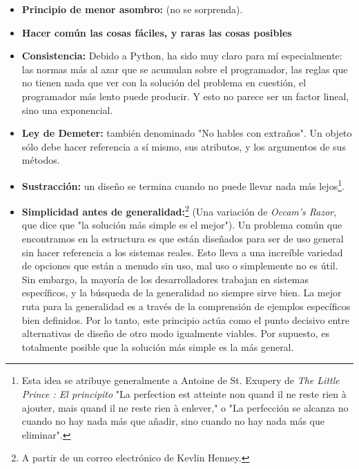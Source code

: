 \begin{itemize} %
    \item \textbf{Principio de menor asombro:}    (no se sorprenda).
    
    \item \textbf{Hacer común las cosas fáciles, y raras las cosas posibles}
    
    \item \textbf{Consistencia:} Debido a Python, ha sido muy claro para mí especialmente: las normas más al azar que se acumulan sobre el programador, las reglas que no tienen nada que ver con la solución del problema en cuestión, el programador más lento puede producir. Y esto no parece ser un factor lineal, sino una exponencial.
    
    \item \textbf{Ley de Demeter:} también denominado "No hables con extraños". Un objeto sólo debe hacer referencia a sí mismo, sus atributos, y los argumentos de sus métodos.
    
    \item \textbf{Sustracción:} un diseño se termina cuando no puede llevar nada más lejos\footnote{Esta idea se atribuye generalmente a Antoine de St. Exupery de \textit{The Little Prince : El principito}  "La perfection est atteinte non quand il ne reste rien à ajouter, mais quand il ne reste rien à enlever," o "La perfección se alcanza no cuando no hay nada más que añadir, sino cuando no hay nada más que eliminar".}.
    
    \item \textbf{Simplicidad antes de generalidad:}\footnote{A partir de un correo electrónico de Kevlin Henney.} (Una variación de \textit{Occam’s Razor}, que dice que "la solución más simple es el mejor"). Un problema común que encontramos en la estructura es que están diseñados para ser de uso general sin hacer referencia a los sistemas reales. Esto lleva a una increíble variedad de opciones que están a menudo sin uso, mal uso o simplemente no es útil. Sin embargo, la mayoría de los desarrolladores trabajan en sistemas específicos, y la búsqueda de la generalidad no siempre sirve bien. La mejor ruta para la generalidad es a través de la comprensión de ejemplos específicos bien definidos. Por lo tanto, este principio actúa como el punto decisivo entre alternativas de diseño de otro modo igualmente viables. Por supuesto, es totalmente posible que la solución más simple es la más general. %
    

\end{itemize}
